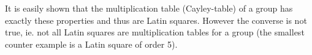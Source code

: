 \documentclass[12pt]{article}
\begin{document}
It is easily shown that the multiplication table (Cayley-table) of a group has exactly these properties and thus are Latin squares. However the converse is not true, ie. not all Latin squares are multiplication tables for a group (the smallest counter example is a Latin square of order 5).
\end{document}
